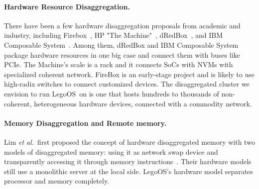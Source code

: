 \documentclass[10pt,times,twocolumn]{z2-article}
\renewcommand{\em}{\it}
\newcommand{\etal}{\textit{et al.}}
\newcommand{\lego}{LegoOS}
\providecommand{\DIFaddtex}[1]{{\protect\color{blue}\uwave{#1}}} %
\providecommand{\DIFaddbegin}{} %
\providecommand{\DIFaddend}{} %
\providecommand{\DIFadd}[1]{\texorpdfstring{\DIFaddtex{#1}}{#1}} %
\newcommand{\DIFaddincludegraphics}[2][]{{\color{blue}\fbox{\DIFOincludegraphics[#1]{#2}}}} %
\DeclareRobustCommand{\DIFaddbegin}{\DIFOaddbegin \let\includegraphics\DIFaddincludegraphics} %
\DeclareRobustCommand{\DIFaddend}{\DIFOaddend \let\includegraphics\DIFOincludegraphics} %
\begin{document}
{{{{{{{\paragraph{Hardware Resource Disaggregation.}
There have been a few hardware disaggregation proposals from academic and industry,
including Firebox~\cite{FireBox-FASTKeynote}, HP "The Machine"~\cite{HP-TheMachine,HP-MemoryOS}, dRedBox~\cite{dRedBox-DATE},
and IBM Composable System~\cite{IBM-Composable}.
Among them, dRedBox and IBM Composable System package hardware resources in one big case 
and connect them with buses like PCIe.
The Machine's scale is a rack and it connects SoCs with NVMs with \DIFaddbegin \DIFadd{a }\DIFaddend specialized coherent network.
FireBox is an early-stage project and is likely to use high-radix switches to connect  customized devices.
The disaggregated cluster we envision to run \lego\ on is one that hosts hundreds to thousands of
non-coherent, heterogeneous hardware devices, connected with a commodity network.

\paragraph{Memory Disaggregation and Remote memory.}
Lim \etal\ first proposed the concept of hardware disaggregated memory
with two models of disaggregated memory: using it as network swap device 
and transparently accessing it through memory instructions~\cite{Lim09-disaggregate,Lim12-HPCA}.
Their hardware models still use a monolithic server at the local side. 
\lego's hardware model separates processor and memory completely. %

}}}}}}}
\end{document}
